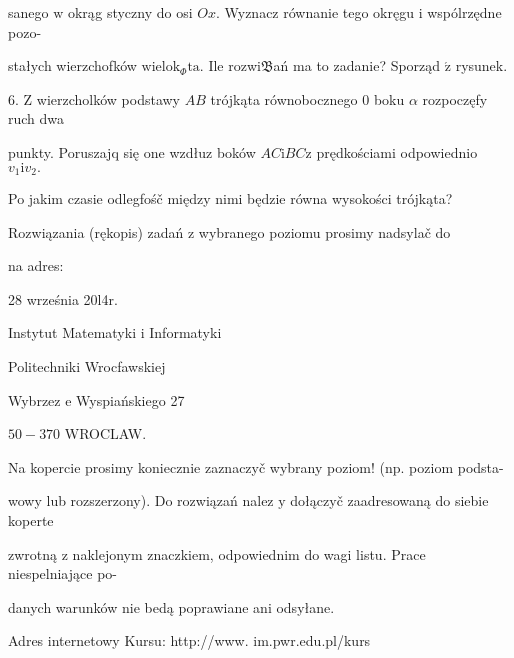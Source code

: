 \documentclass[a4paper,12pt]{article}
\begin{document}
sanego $\mathrm{w}$ okrąg styczny do osi $Ox$. Wyznacz równanie tego okręgu $\mathrm{i}$ wspólrzędne pozo-

stałych wierzchofków $\mathrm{w}\mathrm{i}\mathrm{e}\mathrm{l}\mathrm{o}\mathrm{k}_{\Phi}\mathrm{t}\mathrm{a}$. Ile rozwi$\mathfrak{B}$ań ma to zadanie? Sporząd $\acute{\mathrm{z}}$ rysunek.

6. $\mathrm{Z}$ wierzcholków podstawy $AB$ trójkąta równobocznego $0$ boku $\alpha$ rozpoczęfy ruch dwa

punkty. Poruszajq się one wzdłuz boków $AC\mathrm{i}BC\mathrm{z}$ prędkościami odpowiednio $v_{1}\mathrm{i}v_{2}.$

Po jakim czasie odlegfośč między nimi będzie równa wysokości trójkąta?

Rozwiązania (rękopis) zadań z wybranego poziomu prosimy nadsylač do

na adres:

28 września 20l4r.

Instytut Matematyki $\mathrm{i}$ Informatyki

Politechniki Wrocfawskiej

Wybrzez $\mathrm{e}$ Wyspiańskiego 27

$50-370$ WROCLAW.

Na kopercie prosimy koniecznie zaznaczyč wybrany poziom! (np. poziom podsta-

wowy lub rozszerzony). Do rozwiązań nalez $\mathrm{y}$ dołączyč zaadresowaną do siebie koperte

zwrotną $\mathrm{z}$ naklejonym znaczkiem, odpowiednim do wagi listu. Prace niespelniające po-

danych warunków nie bedą poprawiane ani odsyłane.

Adres internetowy Kursu: http://www. im.pwr.edu.pl/kurs
\end{document}
